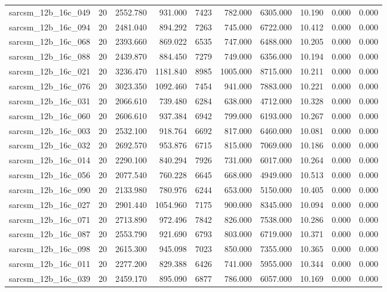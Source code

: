 \begin{tabular}{lrrrrrrrrr}
sarcsm\_12b\_16c\_049 & 20 & 2552.780 & 931.000 & 7423 & 782.000 & 6305.000 & 10.190 & 0.000 & 0.000 \\
sarcsm\_12b\_16c\_094 & 20 & 2481.040 & 894.292 & 7263 & 745.000 & 6722.000 & 10.412 & 0.000 & 0.000 \\
sarcsm\_12b\_16c\_068 & 20 & 2393.660 & 869.022 & 6535 & 747.000 & 6488.000 & 10.205 & 0.000 & 0.000 \\
sarcsm\_12b\_16c\_088 & 20 & 2439.870 & 884.450 & 7279 & 749.000 & 6356.000 & 10.194 & 0.000 & 0.000 \\
sarcsm\_12b\_16c\_021 & 20 & 3236.470 & 1181.840 & 8985 & 1005.000 & 8715.000 & 10.211 & 0.000 & 0.000 \\
sarcsm\_12b\_16c\_076 & 20 & 3023.350 & 1092.460 & 7454 & 941.000 & 7883.000 & 10.221 & 0.000 & 0.000 \\
sarcsm\_12b\_16c\_031 & 20 & 2066.610 & 739.480 & 6284 & 638.000 & 4712.000 & 10.328 & 0.000 & 0.000 \\
sarcsm\_12b\_16c\_060 & 20 & 2606.610 & 937.384 & 6942 & 799.000 & 6193.000 & 10.267 & 0.000 & 0.000 \\
sarcsm\_12b\_16c\_003 & 20 & 2532.100 & 918.764 & 6692 & 817.000 & 6460.000 & 10.081 & 0.000 & 0.000 \\
sarcsm\_12b\_16c\_032 & 20 & 2692.570 & 953.876 & 6715 & 815.000 & 7069.000 & 10.186 & 0.000 & 0.000 \\
sarcsm\_12b\_16c\_014 & 20 & 2290.100 & 840.294 & 7926 & 731.000 & 6017.000 & 10.264 & 0.000 & 0.000 \\
sarcsm\_12b\_16c\_056 & 20 & 2077.540 & 760.228 & 6645 & 668.000 & 4949.000 & 10.513 & 0.000 & 0.000 \\
sarcsm\_12b\_16c\_090 & 20 & 2133.980 & 780.976 & 6244 & 653.000 & 5150.000 & 10.405 & 0.000 & 0.000 \\
sarcsm\_12b\_16c\_027 & 20 & 2901.440 & 1054.960 & 7175 & 900.000 & 8345.000 & 10.094 & 0.000 & 0.000 \\
sarcsm\_12b\_16c\_071 & 20 & 2713.890 & 972.496 & 7842 & 826.000 & 7538.000 & 10.286 & 0.000 & 0.000 \\
sarcsm\_12b\_16c\_087 & 20 & 2553.790 & 921.690 & 6793 & 803.000 & 6719.000 & 10.371 & 0.000 & 0.000 \\
sarcsm\_12b\_16c\_098 & 20 & 2615.300 & 945.098 & 7023 & 850.000 & 7355.000 & 10.365 & 0.000 & 0.000 \\
sarcsm\_12b\_16c\_011 & 20 & 2277.200 & 829.388 & 6426 & 741.000 & 5955.000 & 10.344 & 0.000 & 0.000 \\
sarcsm\_12b\_16c\_039 & 20 & 2459.170 & 895.090 & 6877 & 786.000 & 6057.000 & 10.169 & 0.000 & 0.000 \\

\end{tabular}
